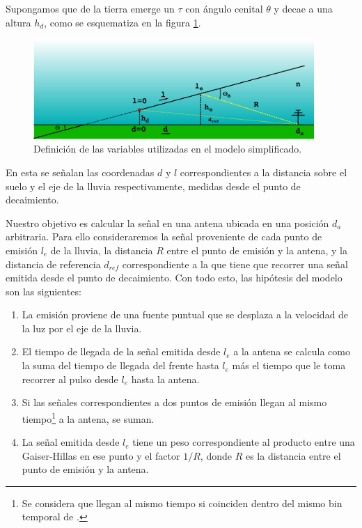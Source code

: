 	Supongamos que de la tierra emerge un $\tau$ con ángulo cenital $\theta$ y decae a una altura $h_d$, como se esquematiza en la figura \ref{fig:esRadio_schema}. 
	\begin{figure}[ht!]
		\centering
		\includegraphics[width=0.95\textwidth]{./fig/EASRadio/timeDelaySchema}
		\caption{\label{fig:esRadio_schema}
		Definici\'on de las variables utilizadas en el modelo simplificado. 
		}
	\end{figure}
	En esta se señalan las coordenadas $d$ y $l$ correspondientes a la distancia sobre el suelo y el eje de la lluvia respectivamente, medidas desde el punto de decaimiento.
	
	Nuestro objetivo es calcular la señal en una antena ubicada en una posición $d_a$ arbitraria.
	Para ello consideraremos la señal proveniente de cada punto de emisión $l_e$ de la lluvia, la distancia $R$ entre el punto de emisión y la antena, y la distancia de referencia $d_{ref}$ correspondiente a la que tiene que recorrer una señal emitida desde el punto de decaimiento.
	Con todo esto, las hipótesis del modelo son las siguientes:
	\begin{enumerate}
	 \item La emisi\'on proviene de una fuente puntual que se desplaza a la velocidad de la luz por el eje de la lluvia.
	 \item El tiempo de llegada de la señal emitida desde $l_e$ a la antena se calcula como la suma del tiempo de llegada del frente hasta $l_e$ m\'as el tiempo que le toma recorrer al pulso desde $l_e$ hasta la antena.
	 \item Si las señales correspondientes a dos puntos de emisión llegan al mismo tiempo\footnote{Se considera que llegan al mismo tiempo si coinciden dentro del mismo bin temporal de .} a la antena, se suman.
	 \item La señal emitida desde $l_e$ tiene un peso correspondiente al producto entre una Gaiser-Hillas en ese punto y el factor $1/R$, donde $R$ es la distancia entre el punto de emisión y la antena.
	\end{enumerate}
	
